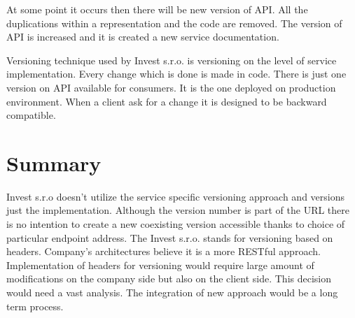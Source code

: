 At some point it occurs then there will be new version of API. All the duplications within a representation and the code are removed. The version of API is increased and it is created a new service documentation.

Versioning technique used by Invest s.r.o. is versioning on the level of service implementation. Every change which is done is made in code. There is just one version on API available for consumers. It is the one deployed on production environment. When a client ask for a change it is designed to be backward compatible.


\section{Summary}
Invest s.r.o doesn't utilize the service specific versioning approach and versions just the implementation. Although the version number is part of the URL there is no intention to create a new coexisting version accessible thanks to choice of particular endpoint address.
The Invest s.r.o. stands for versioning based on headers. Company's architectures believe it is a more RESTful approach. Implementation of headers for versioning would require large amount of modifications on the company side but also on the client side. This decision would need a vast analysis. The integration of new approach would be a long term process. 







